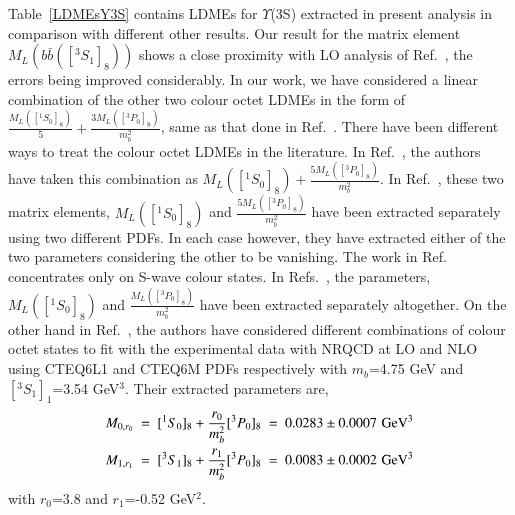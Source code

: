\documentclass[review]{elsarticle}
\begin{document}
Table~\ref{LDMEsY3S} contains LDMEs for $\Upsilon$(3S) extracted in present analysis
in comparison with different other results. Our result for the matrix element $M_L(b\bar{b}([^3S_1]_8))$
shows a close proximity with LO analysis of Ref.~\cite{Brateen:PRD2001,Sharma:2012dy}, the errors being improved
considerably.
In our work, we have considered a linear combination of the other two colour octet 
LDMEs in the form of $\frac{M_{L}([^1S_0]_{8})}{5}+\frac{3M_{L}([^3P_0]_{8})}{m_b^2}$, same as that
done in Ref.~\cite{Sharma:2012dy}.
There have been different ways to treat the colour octet LDMEs in the literature.
In Ref.~\cite{Domenech:2000ri}, 
the authors have taken this combination as $M_{L}([^1S_0]_{8})+\frac{5M_{L}([^3P_0]_{8})}{m_b^2}$.
In Ref.~\cite{Brateen:PRD2001}, these two matrix elements,
$M_{L}([^1S_0]_{8})$ and $\frac{5M_{L}([^3P_0]_{8})}{m_b^2}$
have been extracted separately using two different PDFs. In each case however, they have extracted
either of the two parameters considering the other to be vanishing.
The work in Ref.~\cite{Gong:2010bk} concentrates only on S-wave colour states.
In Refs.~\cite{Gong:2013qka,Feng:2015wka},
the parameters, $M_{L}([^1S_0]_{8})$ and $\frac{M_{L}([^3P_0]_{8})}{m_b^2}$ have been extracted
separately altogether. On the other hand in Ref.~\cite{Han:2014kxa}, the authors have
considered different combinations of 
colour octet states to fit with the experimental data with NRQCD at LO and NLO using 
CTEQ6L1 and CTEQ6M PDFs respectively with $m_b$=4.75 GeV and $[^3S_1]_1$=3.54 GeV$^3$.
Their extracted parameters are,
\begin{eqnarray}
  \nonumber
  M_{0,r_0}~=~[^1S_0]_8+\frac{r_0}{m_b^2}[^3P_0]_8~=~0.0283\pm 0.0007{\rm \,\, GeV^3} \nonumber \\
  M_{1,r_1}~=~[^3S_1]_8+\frac{r_1}{m_b^2}[^3P_0]_8~=~0.0083\pm 0.0002{\rm \,\,GeV^3} 
\end{eqnarray}
with $r_0$=3.8 and $r_1$=-0.52 GeV$^2$.
\end{document}
